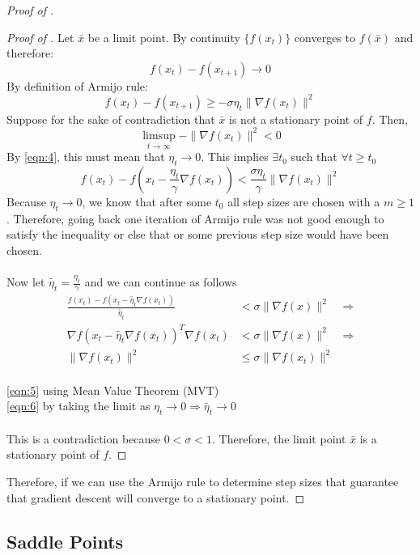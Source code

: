 \begin{proof}[Proof of ]
\begin{proof}[Proof of ]
Let $\bar{x}$ be a limit point. By continuity $\{f(x_t)\}$ converges to $f(\bar{x})$ and therefore:
\[
    f(x_t) - f(x_{t+1}) \to 0
\]
By definition of Armijo rule:
\begin{equation}
    f(x_t) - f(x_{t+1}) \ge -\sigma \eta_t \|\nabla f(x_t)\|^2 \label{eqn:4}
\end{equation}
Suppose for the sake of contradiction that $\bar{x}$ is not a stationary point of $f$. Then,
\[
    \limsup_{t \to \infty} -\|\nabla f(x_t)\|^2 < 0
\]
By \ref{eqn:4}, this must mean that $\eta_t \to 0$. This implies $\exists t_0$ such that $\forall t \ge t_0$
\[
    f(x_t) - f(x_t - \frac{\eta_t}{\gamma} \nabla f(x_t)) < \frac{\sigma \eta_t}{\gamma} \|\nabla f(x_t)\|^2
\]
Because $\eta_t \to 0$, we know that after some $t_0$ all step sizes are chosen with a $m\ge 1$. Therefore, going back one iteration of Armijo rule was not good enough to satisfy the inequality or else that or some previous step size would have been chosen. \\
\\
Now let $\tilde{\eta_t} = \frac{\eta_t}{\gamma}$ and we can continue as follows
\begin{align}
    \frac{f(x_t) - f(x_t - \tilde{\eta_t} \nabla f(x_t))}{\tilde{\eta_t}} &< \sigma \|\nabla f(x)\|^2 &\Rightarrow \nonumber \\
    \nabla f(x_t - \tilde{\eta_t} \nabla f(x_t))^T \nabla f(x_t) &< \sigma \|\nabla f(x)\|^2 &\Rightarrow \label{eqn:5} \\
    \|\nabla f(x_t) \|^2 &\le \sigma \|\nabla f(x_t) \|^2 & \label{eqn:6}
\end{align}
\\
\ref{eqn:5} using Mean Value Theorem (MVT) \\
\ref{eqn:6} by taking the limit as $\eta_t \to 0 \Rightarrow \tilde{\eta_t} \to 0$ \\
\\
This is a contradiction because $0 < \sigma < 1$. Therefore, the limit point $\bar{x}$ is a stationary point of $f$.
\end{proof}
Therefore, if we can use the Armijo rule to determine step sizes that guarantee that gradient descent will converge to a stationary point.
\end{proof}

\subsection{Saddle Points}

